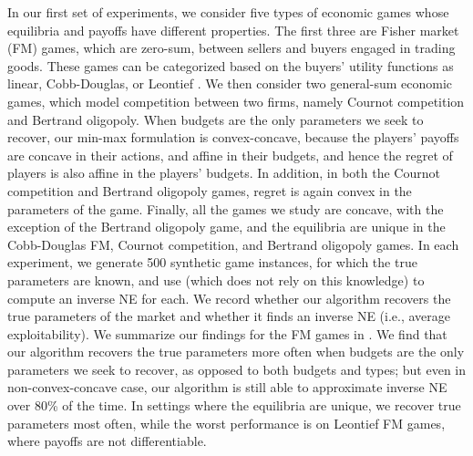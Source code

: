 In our first set of experiments, we consider five types of economic games whose equilibria and payoffs have different properties. 
The first three are Fisher market (FM) games, which are zero-sum, between sellers and buyers engaged in trading goods.
These games can be categorized based on the buyers' utility functions as linear, Cobb-Douglas, or Leontief \citep{fisher-tatonnement}.
We then consider two general-sum economic games, which model competition between two firms, namely Cournot competition and Bertrand oligopoly.
% 
When budgets are the only parameters we seek to recover, our min-max formulation is convex-concave, because the players' payoffs are concave in their actions, and affine in their budgets, and hence the regret of players is also affine in the players' budgets. 
In addition, in both the Cournot competition and Bertrand oligopoly games, regret is again convex in the parameters of the game. 
Finally, all the games we study are concave, with the exception of the Bertrand oligopoly game, and the equilibria are unique in the Cobb-Douglas FM, Cournot competition, and Bertrand oligopoly games. 
%
In each experiment, we generate 500 synthetic game instances, for which the true parameters are known, and use  (which does not rely on this knowledge) to compute an inverse NE for each.
We record whether our algorithm recovers the true parameters of the market and whether it finds an inverse NE (i.e., average exploitability).
%
We summarize our findings for the FM games in .
We find that our algorithm recovers the true parameters more often when budgets are the only parameters we seek to recover, as opposed to both budgets and types;
but even in non-convex-concave case, our algorithm is still able to approximate inverse NE over 80\% of the time. 
In settings where the equilibria are unique, we recover true parameters most often, while the worst performance is on Leontief FM games, where payoffs are not differentiable. 


\begin{table}[H]
    \centering
    
    
    \caption{The percentage of games for which we recovered the true parameters and the average exploitabilities of the observed equilibrium evaluated w.r.t\@ the computed inverse Nash equilibrium.}
    \label{table:both}
    \vspace{-1em}
\end{table}

